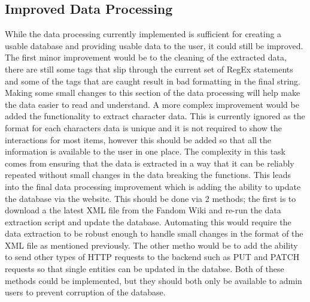 \begin{description}
\subsection*{Improved Data Processing}
While the data processing currently implemented is sufficient for creating a usable database and providing usable data to the user, 
it could still be improved. The first minor improvement would be to the cleaning of the extracted data, there are still some tags that slip 
through the current set of RegEx statements and some of the tags that are caught result in bad formatting in the final string. Making some small 
changes to this section of the data processing will help make the data easier to read and understand. A more complex improvement would be 
added the functionality to extract character data. This is currently ignored as the format for each characters data is unique and it is not required 
to show the interactions for most items, however this should be added so that all the information is available to the user in one place. The complexity in this task 
comes from ensuring that the data is extracted in a way that it can be reliably repeated without small changes in the data breaking the functions. This leads into the final 
data processing improvement which is adding the ability to update the database via the website. This should be done via 2 methods; the first is to download a the latest XML file 
from the Fandom Wiki and re-run the data extraction script and update the database. Automating this would require the data extraction to be robust enough to handle small changes in the format 
of the XML file as mentioned previously. The other metho would be to add the ability to send other types of HTTP requests to the backend such as PUT and PATCH requests so that single entities can be updated 
in the databse. Both of these methods could be implemented, but they should both only be available to admin users to prevent corruption of the database.

\end{description}
